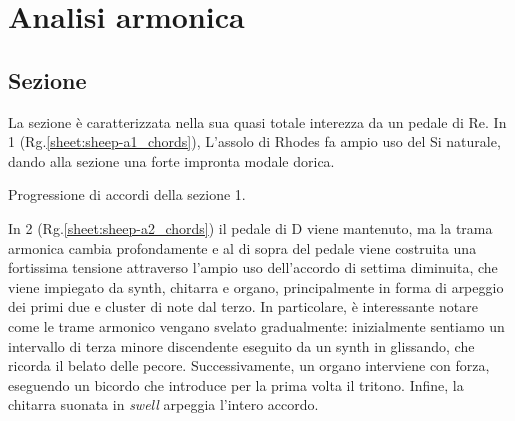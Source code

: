 \documentclass[class=book, crop=false, oneside, 12pt]{standalone}
\begin{document}


    \section{Analisi armonica}
    \label{sec:04-harmony}

    \subsection{Sezione }
    La sezione  è caratterizzata nella sua quasi totale interezza da un pedale di Re. In 1 (Rg.\ref{sheet:sheep-a1_chords}), L'assolo di Rhodes fa ampio uso del Si naturale, dando alla sezione una forte impronta modale dorica.     
    
    \begin{sheet}[htb]
        \centering
        \caption{Progressione di accordi della sezione 1.}
        \label{sheet:sheep-a1_chords}
    \end{sheet}

    In 2 (Rg.\ref{sheet:sheep-a2_chords}) il pedale di D viene mantenuto, ma la trama armonica cambia profondamente e al di sopra del pedale viene costruita una fortissima tensione attraverso l'ampio uso dell'accordo di settima diminuita, che viene impiegato da synth, chitarra e organo, principalmente in forma di arpeggio dei primi due e cluster di note dal terzo. In particolare, è interessante notare come le trame armonico vengano svelato gradualmente: inizialmente sentiamo un intervallo di terza minore discendente eseguito da un synth in glissando, che ricorda il belato delle pecore.
    Successivamente, un organo interviene con forza, eseguendo un bicordo che introduce per la prima volta il tritono. Infine, la chitarra suonata in \emph{swell} arpeggia l'intero accordo. 
    
\end{document}
